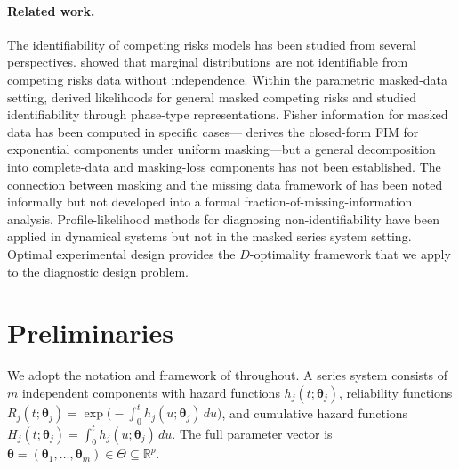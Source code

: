 \documentclass[11pt]{article}
\theoremstyle{definition}
\theoremstyle{plain}
\renewcommand{\v}[1]{\boldsymbol{#1}}
\newcommand{\btheta}{\v{\theta}}
\begin{document}
\paragraph{Related work.}
The identifiability of competing risks models has been studied from
several perspectives.
\citet{tsiatis1975} showed that marginal distributions are not
identifiable from competing risks data without independence.
Within the parametric masked-data setting,
\citet{flehinger2002} derived likelihoods for general masked
competing risks and
\citet{lindqvist2023} studied identifiability through phase-type
representations.
Fisher information for masked data has been computed in specific
cases---\citet{towell2026exponential} derives the closed-form FIM
for exponential components under uniform masking---but a general
decomposition into complete-data and masking-loss components has
not been established.
The connection between masking and the missing data framework
of \citet{little2002} has been noted informally
\citep{towell2025masked,craiu2004} but not developed into a
formal fraction-of-missing-information analysis.
Profile-likelihood methods for diagnosing
non-identifiability have been applied in dynamical systems
\citep{raue2009} but not in the masked series system setting.
Optimal experimental design \citep{atkinson2007,pukelsheim2006}
provides the $D$-optimality framework that we apply to the
diagnostic design problem.




\section{Preliminaries}
\label{sec:prelim}

We adopt the notation and framework of \citet{towell2025masked}
throughout.
A series system consists of $m$ independent components with hazard
functions $h_j(t; \v{\theta}_j)$, reliability functions
$R_j(t; \v{\theta}_j) = \exp\bigl(-\int_0^t h_j(u; \v{\theta}_j)\, du\bigr)$,
and cumulative hazard functions
$H_j(t; \v{\theta}_j) = \int_0^t h_j(u; \v{\theta}_j)\, du$.
The full parameter vector is
$\btheta = (\v{\theta}_1, \ldots, \v{\theta}_m) \in \Theta \subseteq \mathbb{R}^p$.
\end{document}
